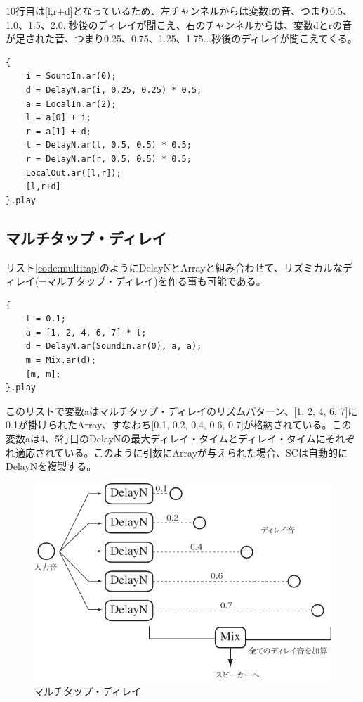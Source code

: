\documentclass{jsarticle}
\begin{document}
10行目は[l,r+d]となっているため、左チャンネルからは変数lの音、つまり0.5、1.0、1.5、2.0..秒後のディレイが聞こえ、右のチャンネルからは、変数dとrの音が足された音、つまり0.25、0.75、1.25、1.75...秒後のディレイが聞こえてくる。

\begin{lstlisting}[caption=ピンポン・ディレイ, label=code:pp]
{
	i = SoundIn.ar(0);
	d = DelayN.ar(i, 0.25, 0.25) * 0.5;
	a = LocalIn.ar(2);
	l = a[0] + i;
	r = a[1] + d;
	l = DelayN.ar(l, 0.5, 0.5) * 0.5; 
	r = DelayN.ar(r, 0.5, 0.5) * 0.5;
	LocalOut.ar([l,r]);
	[l,r+d]
}.play
\end{lstlisting}

\subsection{マルチタップ・ディレイ}
リスト\ref{code:multitap}のようにDelayNとArrayと組み合わせて、リズミカルなディレイ(=マルチタップ・ディレイ)を作る事も可能である。

\begin{lstlisting}[caption=マルチタップ・ディレイ, label=code:multitap]
{
	t = 0.1;
	a = [1, 2, 4, 6, 7] * t;
	d = DelayN.ar(SoundIn.ar(0), a, a);
	m = Mix.ar(d);
	[m, m];
}.play
\end{lstlisting}

このリストで変数aはマルチタップ・ディレイのリズムパターン、[1, 2, 4, 6, 7]に0.1が掛けられたArray、すなわち[0.1, 0.2, 0.4, 0.6, 0.7]が格納されている。この変数aは4、5行目のDelayNの最大ディレイ・タイムとディレイ・タイムにそれぞれ適応されている。このように引数にArrayが与えられた場合、SCは自動的にDelayNを複製する。

\begin{figure}[htbp]
	\begin{center}
		\includegraphics[scale=0.7]{multitap.pdf}
	\end{center}
	\caption{マルチタップ・ディレイ}
	\label{fig:multitap}
\end{figure}
\end{document}

